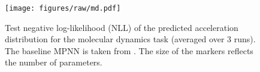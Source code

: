 \begin{figure}
    \centering
    \texttt{[image: figures/raw/md.pdf]}
    \vspace{-5pt}
    \caption{Test negative log-likelihood (NLL) of the predicted acceleration distribution for the molecular dynamics task (averaged over 3 runs). The baseline MPNN is taken from \cite{Fu2022SimulateTC}. The size of the markers reflects the number of parameters.}
    \label{fig:md_results}
\vspace{-5pt}
\end{figure}
